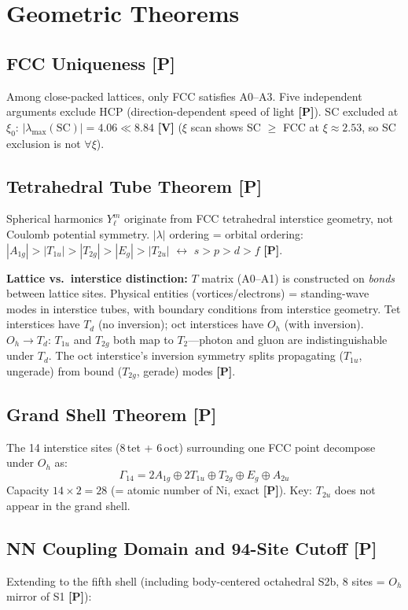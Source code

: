 \documentclass[11pt,a4paper]{article}
\newcommand{\gradeP}{\textbf{[P]}}
\newcommand{\gradeV}{\textbf{[V]}}
\begin{document}
\section{Geometric Theorems}\label{sec:geometry}

\subsection{FCC Uniqueness \gradeP}
Among close-packed lattices, only FCC satisfies A0--A3. Five independent arguments exclude HCP (direction-dependent speed of light \gradeP). SC excluded at $\xi_0$: $|\lambda_{\max}(\mathrm{SC})| = 4.06 \ll 8.84$ \gradeV{} ($\xi$ scan shows SC $\geq$ FCC at $\xi\approx 2.53$, so SC exclusion is not $\forall\xi$).

\subsection{Tetrahedral Tube Theorem \gradeP}
Spherical harmonics $Y_\ell^m$ originate from FCC tetrahedral interstice geometry, not Coulomb potential symmetry. $|\lambda|$ ordering = orbital ordering: $|A_{1g}|>|T_{1u}|>|T_{2g}|>|E_g|>|T_{2u}|$ $\leftrightarrow$ $s>p>d>f$ \gradeP.

\textbf{Lattice vs.\ interstice distinction:} $T$ matrix (A0--A1) is constructed on \emph{bonds} between lattice sites. Physical entities (vortices/electrons) = standing-wave modes in interstice tubes, with boundary conditions from interstice geometry. Tet interstices have $T_d$ (no inversion); oct interstices have $O_h$ (with inversion). $O_h\to T_d$: $T_{1u}$ and $T_{2g}$ both map to $T_2$---photon and gluon are indistinguishable under $T_d$. The oct interstice's inversion symmetry splits propagating ($T_{1u}$, ungerade) from bound ($T_{2g}$, gerade) modes \gradeP.

\subsection{Grand Shell Theorem \gradeP}
The 14 interstice sites (8\,tet + 6\,oct) surrounding one FCC point decompose under $O_h$ as:
$$\Gamma_{14} = 2A_{1g} \oplus 2T_{1u} \oplus T_{2g} \oplus E_g \oplus A_{2u}$$
Capacity $14\times 2 = 28$ (= atomic number of Ni, exact \gradeP). Key: $T_{2u}$ does not appear in the grand shell.

\subsection{NN Coupling Domain and 94-Site Cutoff \gradeP}
Extending to the fifth shell (including body-centered octahedral S2b, 8 sites = $O_h$ mirror of S1 \gradeP):
\end{document}
